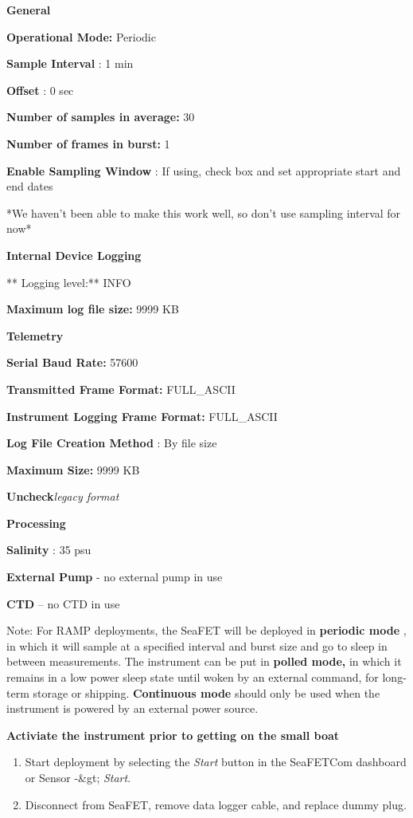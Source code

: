 \documentclass[]{book}
\providecommand{\tightlist}{%
  \setlength{\itemsep}{0pt}\setlength{\parskip}{0pt}}
\begin{document}
\textbf{General}

\textbf{Operational Mode:} Periodic

\textbf{Sample Interval} : 1 min

\textbf{Offset} : 0 sec

\textbf{Number of samples in average:} 30

\textbf{Number of frames in burst:} 1

\textbf{Enable Sampling Window} : If using, check box and set appropriate start and end dates

*We haven't been able to make this work well, so don't use sampling interval for now*

\textbf{Internal Device Logging}

** Logging level:** INFO

\textbf{Maximum log file size:} 9999 KB

\textbf{Telemetry}

\textbf{Serial Baud Rate:} 57600

\textbf{Transmitted Frame Format:} FULL\_ASCII

\textbf{Instrument Logging Frame Format:} FULL\_ASCII

\textbf{Log File Creation Method} : By file size

\textbf{Maximum Size:} 9999 KB

\textbf{Uncheck}\emph{legacy format}

\textbf{Processing}

\textbf{Salinity} : 35 psu

\textbf{External Pump} - no external pump in use

\textbf{CTD} -- no CTD in use

Note: For RAMP deployments, the SeaFET will be deployed in \textbf{periodic mode} , in which it will sample at a specified interval and burst size and go to sleep in between measurements. The instrument can be put in \textbf{polled mode,} in which it remains in a low power sleep state until woken by an external command, for long-term storage or shipping. \textbf{Continuous mode} should only be used when the instrument is powered by an external power source.

\textbf{Activiate the instrument prior to getting on the small boat}

\begin{enumerate}
\def\labelenumi{\arabic{enumi}.}
\tightlist
\item
  Start deployment by selecting the \emph{Start} button in the SeaFETCom dashboard or Sensor -\&gt; \emph{Start}.
\item
  Disconnect from SeaFET, remove data logger cable, and replace dummy plug.
\end{enumerate}
\end{document}
